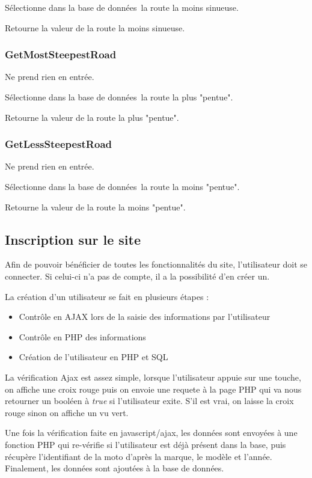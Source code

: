 \documentclass[a4paper]{article}
\newcommand{\bdd}{base de données}
\newcommand{\diag}[1]{}
\begin{document}
Sélectionne dans la \bdd \ la route la moins sinueuse.

Retourne la valeur de la route la moins sinueuse.

\subsubsection{GetMostSteepestRoad}
Ne prend rien en entrée.

Sélectionne dans la \bdd \  la route la plus "pentue".

Retourne la valeur de la route la plus "pentue".

\subsubsection{GetLessSteepestRoad}
Ne prend rien en entrée.

Sélectionne dans la \bdd \  la route la moins "pentue".

Retourne la valeur de la route la moins "pentue".

\newpage
\subsection{Inscription sur le site}

Afin de pouvoir bénéficier de toutes les fonctionnalités du site, l'utilisateur doit se connecter. Si celui-ci n'a pas de compte, il a la possibilité d'en créer un. 

La création d'un utilisateur se fait en plusieurs étapes :
\begin{itemize}
    \item Contrôle en AJAX lors de la saisie des informations par l'utilisateur
    \item Contrôle en PHP des informations
    \item Création de l'utilisateur en PHP et SQL
\end{itemize}

La vérification Ajax est assez simple, lorsque l'utilisateur appuie sur une touche, on affiche une croix rouge puis on envoie une requete à la page PHP qui va nous retourner un booléen à \emph{true} si l'utilisateur exite. S'il est vrai, on laisse la croix rouge sinon on affiche un vu vert.

Une fois la vérification faite en javascript/ajax, les données sont envoyées à une fonction PHP qui re-vérifie si l'utilisateur est déjà présent dans la base, puis récupère l'identifiant de la moto d'après la marque, le modèle et l'année.
Finalement, les données sont ajoutées à la base de données.
\begin{center}
	 \diag{Inscription}
\end{center}
\end{document}
